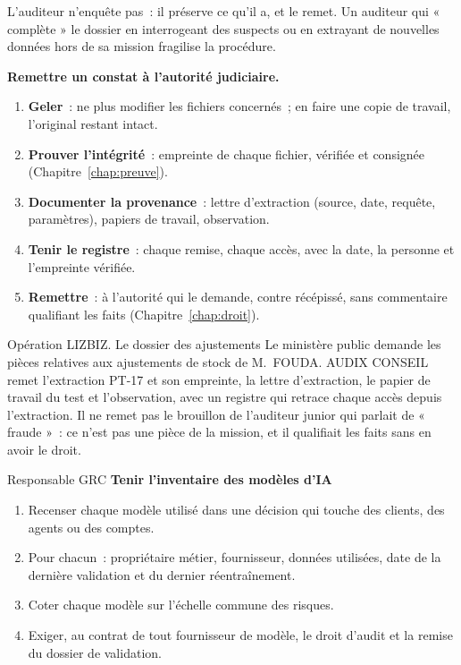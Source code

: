 L'auditeur n'enquête pas~: il préserve ce qu'il a, et le remet. Un
auditeur qui « complète » le dossier en interrogeant des suspects ou en
extrayant de nouvelles données hors de sa mission fragilise la procédure.

\begin{boxprocedure}
\textbf{Remettre un constat à l'autorité judiciaire.}
\begin{enumerate}
    \item \textbf{Geler}~: ne plus modifier les fichiers concernés~; en
          faire une copie de travail, l'original restant intact.
    \item \textbf{Prouver l'intégrité}~: empreinte de chaque fichier,
          vérifiée et consignée (Chapitre~\ref{chap:preuve}).
    \item \textbf{Documenter la provenance}~: lettre d'extraction (source,
          date, requête, paramètres), papiers de travail, observation.
    \item \textbf{Tenir le registre}~: chaque remise, chaque accès, avec la
          date, la personne et l'empreinte vérifiée.
    \item \textbf{Remettre}~: à l'autorité qui le demande, contre récépissé,
          sans commentaire qualifiant les faits (Chapitre~\ref{chap:droit}).
\end{enumerate}
\end{boxprocedure}

\begin{boxscenario}{Opération LIZBIZ. Le dossier des ajustements}
Le ministère public demande les pièces relatives aux ajustements de stock
de M.~FOUDA. AUDIX CONSEIL remet l'extraction PT-17 et son empreinte, la
lettre d'extraction, le papier de travail du test et l'observation, avec
un registre qui retrace chaque accès depuis l'extraction. Il ne remet pas
le brouillon de l'auditeur junior qui parlait de « fraude »~: ce n'est
pas une pièce de la mission, et il qualifiait les faits sans en avoir
le droit.
\end{boxscenario}

\begin{boxmetier}{Responsable GRC}
\textbf{Tenir l'inventaire des modèles d'IA}
\begin{enumerate}
    \item Recenser chaque modèle utilisé dans une décision qui touche des
          clients, des agents ou des comptes.
    \item Pour chacun~: propriétaire métier, fournisseur, données utilisées,
          date de la dernière validation et du dernier réentraînement.
    \item Coter chaque modèle sur l'échelle commune des risques.
    \item Exiger, au contrat de tout fournisseur de modèle, le droit d'audit
          et la remise du dossier de validation.
\end{enumerate}
\end{boxmetier}

